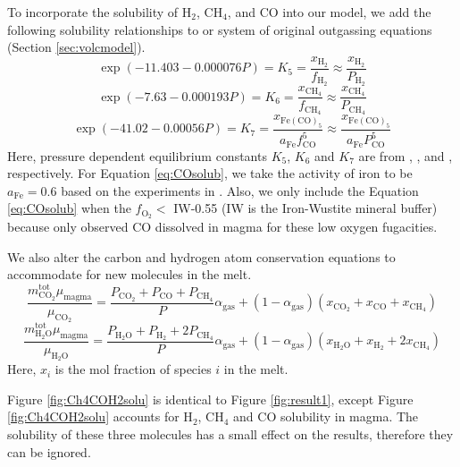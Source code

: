 To incorporate the solubility of H$_2$, CH$_4$, and CO into our model, we add the following solubility relationships to or system of original outgassing equations (Section \ref{sec:volcmodel}).
\begin{equation}
    \exp(-11.403-0.000076P)=K_5=\frac{x_\mathrm{H_2}}{f_\mathrm{H_2}} \approx \frac{x_\mathrm{H_2}}{P_\mathrm{H_2}}
\end{equation}
\begin{equation}
    \exp(-7.63-0.000193P)=K_6=\frac{x_\mathrm{CH_4}}{f_\mathrm{CH_4}} \approx \frac{x_\mathrm{CH_4}}{P_\mathrm{CH_4}}
\end{equation}
\begin{equation} \label{eq:COsolub}
    \exp(-41.02-0.00056P) = K_7 = \frac{x_\mathrm{Fe(CO)_5}}{a_\mathrm{Fe}f_\mathrm{CO}^5} \approx \frac{x_\mathrm{Fe(CO)_5}}{a_\mathrm{Fe}P_\mathrm{CO}^5}
\end{equation}
Here, pressure dependent equilibrium constants $K_5$, $K_6$ and $K_7$ are from \citet{Hirschmann_2012}, \citet{Ardia_2013}, and \citet{Wetzel_2013}, respectively. For Equation \eqref{eq:COsolub}, we take the activity of iron to be $a_\mathrm{Fe}=0.6$ based on the experiments in \citet{Wetzel_2013}. Also, we only include the Equation \eqref{eq:COsolub} when the $f_\mathrm{O_2}<$ IW-0.55 (IW is the Iron-Wustite mineral buffer) because \citet{Wetzel_2013} only observed CO dissolved in magma for these low oxygen fugacities.

We also alter the carbon and hydrogen atom conservation equations to accommodate for new molecules in the melt.
\begin{equation} 
    \frac{m_\mathrm{CO_2}^\mathrm{tot}\mu_\mathrm{magma}}{\mu_\mathrm{CO_2}} = \frac{P_\mathrm{CO_2}+P_\mathrm{CO}+P_\mathrm{CH_4}}{P}\alpha_\mathrm{gas} + \left(1-\alpha_\mathrm{gas}\right)(x_\mathrm{CO_2}+x_\mathrm{CO}+x_\mathrm{CH_4})
\end{equation}
\begin{equation} 
    \frac{m_\mathrm{H_2O}^\mathrm{tot}\mu_\mathrm{magma}}{\mu_\mathrm{H_2O}} = \frac{P_\mathrm{H_2O}+P_\mathrm{H_2}+2P_\mathrm{CH_4}}{P}\alpha_\mathrm{gas} + \left(1-\alpha_\mathrm{gas}\right)(x_\mathrm{H_2O}+x_\mathrm{H_2}+2x_\mathrm{CH_4})
\end{equation}
Here, $x_i$ is the mol fraction of species $i$ in the melt.

Figure \ref{fig:Ch4COH2solu} is identical to Figure \ref{fig:result1}, except Figure \ref{fig:Ch4COH2solu} accounts for H$_2$, CH$_4$ and CO solubility in magma. The solubility of these three molecules has a small effect on the results, therefore they can be ignored.

